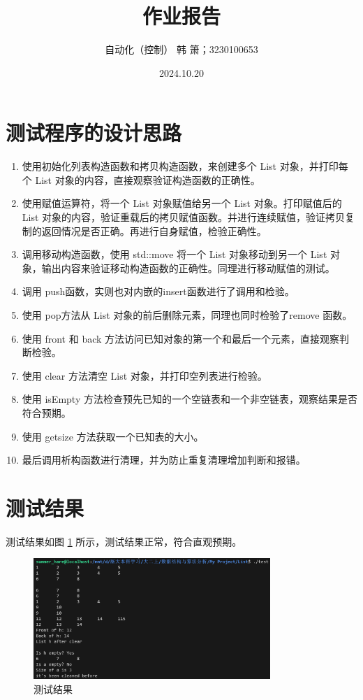\documentclass[UTF8]{ctexart}
\title{作业报告}
\author{自动化（控制） 韩 箫；3230100653}
\date{2024.10.20}
\begin{document}
\maketitle

\pagestyle{fancy}
\fancyhead{}


\section{测试程序的设计思路}
\begin{enumerate}
    \item 使用初始化列表构造函数和拷贝构造函数，来创建多个 List 对象，并打印每个 List 对象的内容，直接观察验证构造函数的正确性。
    \item 使用赋值运算符，将一个 List 对象赋值给另一个 List 对象。打印赋值后的 List 对象的内容，验证重载后的拷贝赋值函数。并进行连续赋值，验证拷贝复制的返回情况是否正确。再进行自身赋值，检验正确性。
    \item 调用移动构造函数，使用 std::move 将一个 List 对象移动到另一个 List 对象，输出内容来验证移动构造函数的正确性。同理进行移动赋值的测试。
    \item 调用 push函数，实则也对内嵌的insert函数进行了调用和检验。
    \item 使用 pop方法从 List 对象的前后删除元素，同理也同时检验了remove 函数。
    \item 使用 front 和 back 方法访问已知对象的第一个和最后一个元素，直接观察判断检验。
    \item 使用 clear 方法清空 List 对象，并打印空列表进行检验。
    \item 使用 isEmpty 方法检查预先已知的一个空链表和一个非空链表，观察结果是否符合预期。
    \item 使用 getsize 方法获取一个已知表的大小。
    \item 最后调用析构函数进行清理，并为防止重复清理增加判断和报错。
\end{enumerate}


\section{测试结果}
测试结果如图 \ref{fig:result} 所示，测试结果正常，符合直观预期。
\begin{figure}[h]
    \centering
    \includegraphics[width=0.8\textwidth]{运行结果.png} 
    \caption{测试结果}
    \label{fig:result}
\end{figure}
\end{document}
